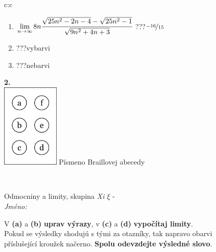 \documentclass[10pt]{report}
\begin{document}
\begin{tabular}{c:c}
\begin{minipage}[c][104.5mm][t]{0.5\linewidth}
\begin{center}
\begin{minipage}{0.79\linewidth}
\begin{center}
\begin{varwidth}{\linewidth}
\begin{enumerate}
\item $\lim\limits_{n\to\infty}8n\cfrac{\sqrt{25n^2-2n-4}-\sqrt{25n^2-1}}{\sqrt{9n^2+4n+3}}$\quad \dotfill\; ???\;\dotfill \quad $\nicefrac{-16}{15}$
\item \quad \dotfill\; ???\;\dotfill \quad vybarvi
\item \quad \dotfill\; ???\;\dotfill \quad nebarvi
\end{enumerate}
\end{varwidth}
\end{center}
\end{minipage}
\begin{minipage}{0.20\linewidth}
\begin{center}
{\Huge\bfseries 2.} \\[2mm]
\includegraphics[height=40mm]{../images/braille.png}
{\small Písmeno Braillovej abecedy}
\end{center}
\end{minipage}
\end{center}
\end{minipage}
\\ \hdashline
\begin{minipage}[c][104.5mm][t]{0.5\linewidth}
\begin{center}
\vspace{7mm}
{\huge Odmocniny a limity, skupina \textit{Xi $\xi$} -}\\[5mm]
\textit{Jméno:}\phantom{xxxxxxxxxxxxxxxxxxxxxxxxxxxxxxxxxxxxxxxxxxxxxxxxxxxxxxxxxxxxxxxxx}\\[5mm]
\begin{minipage}{0.95\linewidth}
\begin{center}
V \textbf{(a)} a \textbf{(b)} \textbf{uprav výrazy}, v \textbf{(c)} a \textbf{(d)} \textbf{vypočítaj limity}.\\Pokud se výsledky shodujú s tými za otazníky, tak napravo obarvi\\příslušející kroužek načerno. \textbf{Spolu odevzdejte výsledné slovo}.
\end{center}
\end{minipage}
\\[1mm]

\end{center}
\end{minipage}
\end{tabular}
\end{document}
